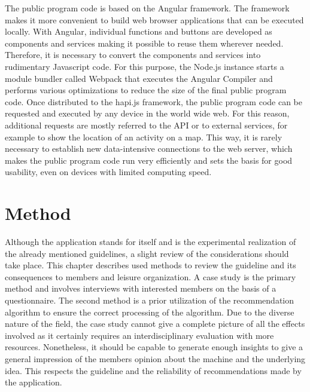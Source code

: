 \documentclass[12pt,numbers=noenddot,parskip,bibliography=totocnumbered,listof=totocnumbered,draft]{scrreprt}
\begin{document}
The public program code is based on the \mbox{Angular} \citep{angular} framework. The framework makes it more convenient to build web browser applications that can be executed locally. With \mbox{Angular}, individual functions and buttons are developed as components and services making it possible to reuse them wherever needed. Therefore, it is necessary to convert the components and services into rudimentary Javascript code. For this purpose, the \mbox{Node.js} instance starts a module bundler called \mbox{Webpack} \citep{webpack} that executes the \mbox{Angular} Compiler and performs various optimizations to reduce the size of the final public program code. Once distributed to the \mbox{hapi.js} framework, the public program code can be requested and executed by any device in the world wide web. For this reason, additional requests are mostly referred to the API or to external services, for example to show the location of an activity on a map. This way, it is rarely necessary to establish new data-intensive connections to the web server, which makes the public program code run very efficiently and sets the basis for good usability, even on devices with limited computing speed.

\chapter{Method}
Although the application stands for itself and is the experimental realization of the already mentioned guidelines, a slight review of the considerations should take place. This chapter describes used methods to review the guideline and its consequences to members and leisure organization. A case study is the primary method and involves interviews with interested members on the basis of a questionnaire. The second method is a prior utilization of the recommendation algorithm to ensure the correct processing of the algorithm. Due to the diverse nature of the field, the case study cannot give a complete picture of all the effects involved as it certainly requires an interdisciplinary evaluation with more resources. Nonetheless, it should be capable to generate enough insights to give a general impression of the members opinion about the machine and the underlying idea. This respects the guideline and the reliability of recommendations made by the application. 
\end{document}
